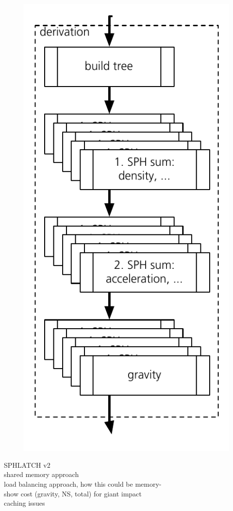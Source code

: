 \begin{figure}[htbp]
\begin{center}
\includegraphics[scale=0.6]{22algo_sphlatch02.pdf}
\caption{}
\label{ch02_grav02_fig12}
\end{center}
\end{figure}


SPHLATCH v2\\
shared memory approach\\
load balancing approach, how this could be memory-\\
show cost (gravity, NS, total) for giant impact\\
caching issues\\

